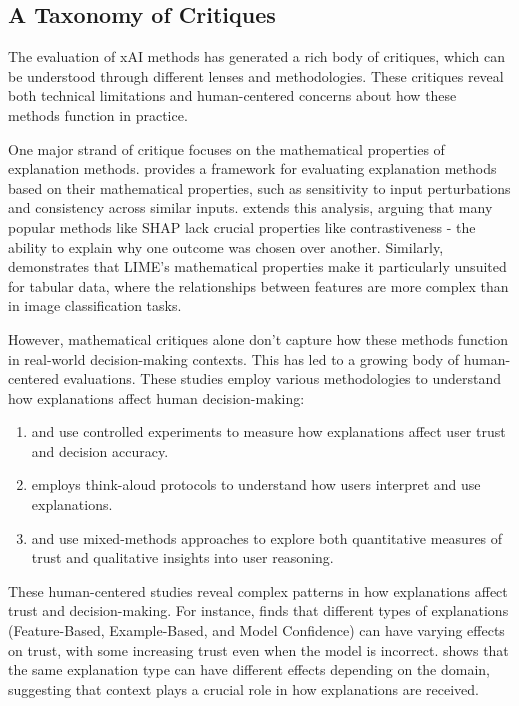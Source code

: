 \subsection{A Taxonomy of Critiques}
The evaluation of xAI methods has generated a rich body of critiques, which can be understood through different lenses and methodologies. These critiques reveal both technical limitations and human-centered concerns about how these methods function in practice.

One major strand of critique focuses on the mathematical properties of explanation methods. \textcite{doshi-velez_towards_2017} provides a framework for evaluating explanation methods based on their mathematical properties, such as sensitivity to input perturbations and consistency across similar inputs. \textcite{kumar_problems_2020} extends this analysis, arguing that many popular methods like SHAP lack crucial properties like contrastiveness - the ability to explain why one outcome was chosen over another. Similarly, \textcite{lundberg_unified_2017} demonstrates that LIME's mathematical properties make it particularly unsuited for tabular data, where the relationships between features are more complex than in image classification tasks.

However, mathematical critiques alone don't capture how these methods function in real-world decision-making contexts. This has led to a growing body of human-centered evaluations. These studies employ various methodologies to understand how explanations affect human decision-making:

\begin{enumerate}
    \item \textcite{ribeiro_why_2016} and \textcite{ribeiro_anchors_2018} use controlled experiments to measure how explanations affect user trust and decision accuracy.
    \item \textcite{rader_explanations_2018} employs think-aloud protocols to understand how users interpret and use explanations.
    \item \textcite{jacobs_how_2021} and \textcite{bansal_does_2021} use mixed-methods approaches to explore both quantitative measures of trust and qualitative insights into user reasoning.
\end{enumerate}

These human-centered studies reveal complex patterns in how explanations affect trust and decision-making. For instance, \textcite{lai_human_2019} finds that different types of explanations (Feature-Based, Example-Based, and Model Confidence) can have varying effects on trust, with some increasing trust even when the model is incorrect. \textcite{binns_its_2018} shows that the same explanation type can have different effects depending on the domain, suggesting that context plays a crucial role in how explanations are received.


